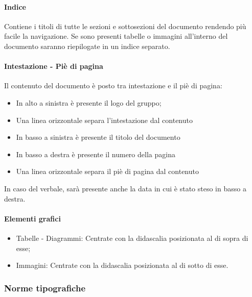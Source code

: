 \paragraph{Indice} 
Contiene i titoli di tutte le sezioni e sottosezioni del documento rendendo più facile la navigazione.
Se sono presenti tabelle o immagini all'interno del documento saranno riepilogate in un indice separato.

\paragraph{Intestazione - Piè di pagina} 
Il contenuto del documento è posto tra intestazione e il piè di pagina:

\begin{itemize}
\item In alto a sinistra è presente il logo del gruppo;
\item Una linea orizzontale separa l’intestazione dal contenuto
\item In basso a sinistra è presente il titolo del documento
\item In basso a destra è presente il numero della pagina
\item Una linea orizzontale separa il piè di pagina dal contenuto
\end{itemize}

In caso del verbale, sarà presente anche la data in cui è stato steso in basso a destra.

\paragraph{Elementi grafici}
\begin{itemize}
\item Tabelle - Diagrammi: Centrate con la didascalia posizionata al di sopra di esse;
\item Immagini: Centrate con la didascalia posizionata al di sotto di esse.
\end{itemize}


\subsubsection{Norme tipografiche}


